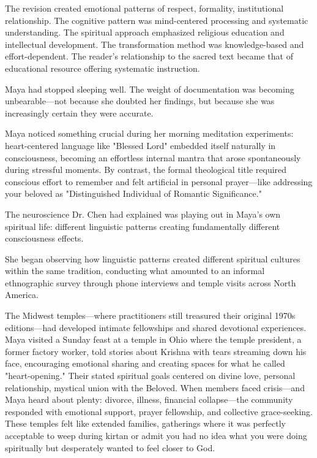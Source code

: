 \documentclass[12pt,twoside]{book}
\begin{document}
The revision created emotional patterns of respect, formality, institutional relationship. The cognitive pattern was mind-centered processing and systematic understanding. The spiritual approach emphasized religious education and intellectual development. The transformation method was knowledge-based and effort-dependent. The reader's relationship to the sacred text became that of educational resource offering systematic instruction.

Maya had stopped sleeping well. The weight of documentation was becoming unbearable—not because she doubted her findings, but because she was increasingly certain they were accurate.

Maya noticed something crucial during her morning meditation experiments: heart-centered language like "Blessed Lord" embedded itself naturally in consciousness, becoming an effortless internal mantra that arose spontaneously during stressful moments. By contrast, the formal theological title required conscious effort to remember and felt artificial in personal prayer—like addressing your beloved as "Distinguished Individual of Romantic Significance."

The neuroscience Dr. Chen had explained was playing out in Maya's own spiritual life: different linguistic patterns creating fundamentally different consciousness effects.

She began observing how linguistic patterns created different spiritual cultures within the same tradition, conducting what amounted to an informal ethnographic survey through phone interviews and temple visits across North America.

The Midwest temples—where practitioners still treasured their original 1970s editions—had developed intimate fellowships and shared devotional experiences. Maya visited a Sunday feast at a temple in Ohio where the temple president, a former factory worker, told stories about Krishna with tears streaming down his face, encouraging emotional sharing and creating spaces for what he called "heart-opening." Their stated spiritual goals centered on divine love, personal relationship, mystical union with the Beloved. When members faced crisis—and Maya heard about plenty: divorce, illness, financial collapse—the community responded with emotional support, prayer fellowship, and collective grace-seeking. These temples felt like extended families, gatherings where it was perfectly acceptable to weep during kirtan or admit you had no idea what you were doing spiritually but desperately wanted to feel closer to God.
\end{document}
